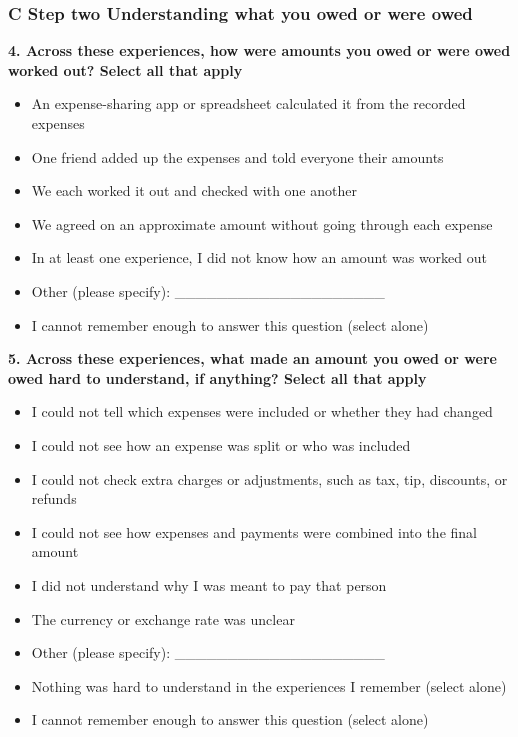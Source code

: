\subsubsection*{C Step two Understanding what you owed or were owed}

\par\smallskip\noindent\textbf{4. Across these experiences, how were amounts you owed or were owed worked out? Select all that apply}\par\nobreak

\begin{itemize}
\item
  An expense-sharing app or spreadsheet calculated it from the recorded expenses
\item
  One friend added up the expenses and told everyone their amounts
\item
  We each worked it out and checked with one another
\item
  We agreed on an approximate amount without going through each expense
\item
  In at least one experience, I did not know how an amount was worked out
\item
  Other (please specify): \_\_\_\_\_\_\_\_\_\_\_\_\_\_\_\_\_\_\_\_
\item
  I cannot remember enough to answer this question (select alone)
\end{itemize}

\par\smallskip\noindent\textbf{5. Across these experiences, what made an amount you owed or were owed hard to understand, if anything? Select all that apply}\par\nobreak

\begin{itemize}
\item
  I could not tell which expenses were included or whether they had changed
\item
  I could not see how an expense was split or who was included
\item
  I could not check extra charges or adjustments, such as tax, tip, discounts, or refunds
\item
  I could not see how expenses and payments were combined into the final amount
\item
  I did not understand why I was meant to pay that person
\item
  The currency or exchange rate was unclear
\item
  Other (please specify): \_\_\_\_\_\_\_\_\_\_\_\_\_\_\_\_\_\_\_\_
\item
  Nothing was hard to understand in the experiences I remember (select alone)
\item
  I cannot remember enough to answer this question (select alone)
\end{itemize}

